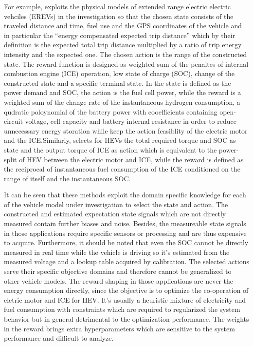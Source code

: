 \documentclass{article}
\begin{document}
For example, \parencite{Wang_2020} exploits the physical models of extended range electric electric vehciles (EREVs) in the investigation so that the chosen state consists of the traveled distance and time, fuel use and the GPS coordinates of the vehicle and in particular the ``energy compensated expected trip distance'' which by their definition is the expected total trip distance multiplied by a ratio of trip energy intensity and the expected one. The chosen action is the range of the constructed state. The reward function is designed as weighted sum of the penaltes of internal combustion engine (ICE) operation, low state of charge (SOC), change of the constructed state and a specific terminal state. In \parencite{Hou_2022} the state is defined as the power demand and SOC, the action is the fuel cell power, while the reward is a weighted sum of the change rate of the instantaneous hydrogen consumption, a qudratic poloynomial of the battery power with cooefficients containing open-circuit voltage, cell capacity and battery internal resistance in order to reduce unnecessary energy storation while keep the action feasiblity of the electric motor and the ICE.\@ Similarly, \parencite{Hu_2018} selects for HEVs the total required torque and SOC as state and the output torque of ICE as action which is equivalent to the power-split of HEV between the electric motor and ICE, while the reward is defined as the reciprocal of instantaneous fuel consumption of the ICE conditioned on the range of itself and the instantaneous SOC\@.

It can be seen that these methods exploit the domain specific knowledge for each of the vehicle model under investigation to select the state and action. The constructed and estimated expectation state signals which are not directly measured contain further biases and noise. Besides, the measureable state signals in those applications require specific sensors or processing and are thus expensive to acquire. Furthermore, it should be noted that even the SOC cannot be directly measured in real time while the vehicle is driving so it's estimated from the measured voltage and a lookup table acquired by calibration. The selected actions serve their specific objective domains and therefore cannot be generalized to other vehicle models. The reward shaping in those applications are never the energy consumption directly, since the objective is to optimize the co-operation of eletric motor and ICE for HEV\@. It's usually a heuristic mixture of electricity and fuel consumption with constraints which are required to regularized the system behavior but in general detrimental to the optimization performance. The weights in the reward brings extra hyperparameters which are sensitive to the system performance and difficult to analyze.
\end{document}
